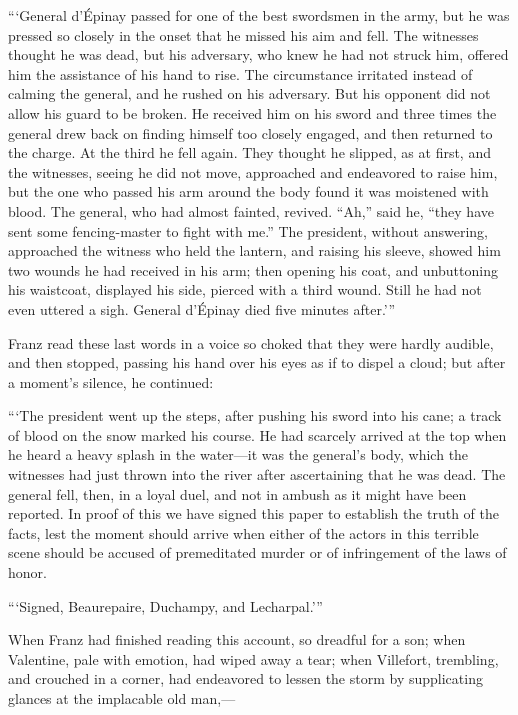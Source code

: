 “‘General d’Épinay passed for one of the best swordsmen in the army,
but he was pressed so closely in the onset that he missed his aim and
fell. The witnesses thought he was dead, but his adversary, who knew he
had not struck him, offered him the assistance of his hand to rise. The
circumstance irritated instead of calming the general, and he rushed on
his adversary. But his opponent did not allow his guard to be broken.
He received him on his sword and three times the general drew back on
finding himself too closely engaged, and then returned to the charge.
At the third he fell again. They thought he slipped, as at first, and
the witnesses, seeing he did not move, approached and endeavored to
raise him, but the one who passed his arm around the body found it was
moistened with blood. The general, who had almost fainted, revived.
“Ah,” said he, “they have sent some fencing-master to fight with me.”
The president, without answering, approached the witness who held the
lantern, and raising his sleeve, showed him two wounds he had received
in his arm; then opening his coat, and unbuttoning his waistcoat,
displayed his side, pierced with a third wound. Still he had not even
uttered a sigh. General d’Épinay died five minutes after.’”

Franz read these last words in a voice so choked that they were hardly
audible, and then stopped, passing his hand over his eyes as if to
dispel a cloud; but after a moment’s silence, he continued:

“‘The president went up the steps, after pushing his sword into his
cane; a track of blood on the snow marked his course. He had scarcely
arrived at the top when he heard a heavy splash in the water—it was the
general’s body, which the witnesses had just thrown into the river
after ascertaining that he was dead. The general fell, then, in a loyal
duel, and not in ambush as it might have been reported. In proof of
this we have signed this paper to establish the truth of the facts,
lest the moment should arrive when either of the actors in this
terrible scene should be accused of premeditated murder or of
infringement of the laws of honor.

“‘Signed, Beaurepaire, Duchampy, and Lecharpal.’”

When Franz had finished reading this account, so dreadful for a son;
when Valentine, pale with emotion, had wiped away a tear; when
Villefort, trembling, and crouched in a corner, had endeavored to
lessen the storm by supplicating glances at the implacable old man,—


